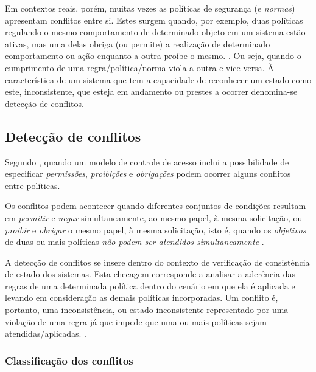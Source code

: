 \documentclass[
	12pt,				%
	openright,			%
	oneside,			%
	a4paper,			%
	english,			%
	french,				%
	spanish,			%
	brazil				%
	]{abntex2}
\begin{document}
Em contextos reais, porém, muitas vezes as políticas de segurança (e \textit{normas}) apresentam conflitos entre si. Estes surgem quando, por exemplo, duas políticas regulando o mesmo comportamento de determinado objeto em um sistema estão ativas, mas uma delas obriga (ou permite) a realização de determinado comportamento ou ação enquanto a outra proíbe o mesmo. \cite{sarkis2017}\cite{eduardo2017}. Ou seja, quando o cumprimento de uma regra/política/norma viola a outra e vice-versa. À característica de um sistema que tem a capacidade de reconhecer um estado como este, inconsistente, que esteja em andamento ou prestes a ocorrer denomina-se detecção de conflitos.

\subsection{Detecção de conflitos} \label{deteccao_conflitos}

Segundo , quando um modelo de controle de acesso inclui a possibilidade de especificar \textit{permissões}, \textit{proibições} e \textit{obrigações} podem ocorrer alguns conflitos entre políticas. 

Os conflitos podem acontecer quando diferentes conjuntos de condições resultam em \textit{permitir} e \textit{negar} simultaneamente, ao mesmo papel, à mesma solicitação, ou \textit{proibir} e \textit{obrigar} o mesmo papel, à mesma solicitação, isto é, quando os \textit{objetivos} de duas ou mais políticas \textit{não podem ser atendidos simultaneamente} \cite{cuppens_high_2007}.

A detecção de conflitos se insere dentro do contexto de verificação de consistência de estado dos sistemas. Esta checagem corresponde a analisar a aderência das regras de uma determinada política dentro do cenário em que ela é aplicada e levando em consideração as demais políticas incorporadas. Um conflito é, portanto, uma inconsistência, ou estado inconsistente representado por uma violação de uma regra já que impede que uma ou mais políticas sejam atendidas/aplicadas. \cite[p. 2]{ueda_tese_2012}. 

\subsubsection{Classificação dos conflitos}
\end{document}
